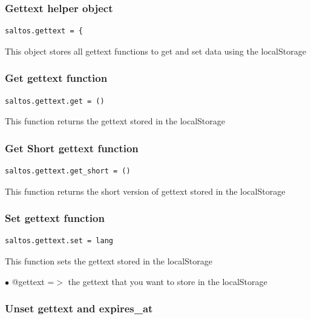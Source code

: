 \documentclass[a4paper]{article}
\begin{document}
\hypertarget{toc237}{}
\subsubsection{Gettext helper object}

\begin{lstlisting}
saltos.gettext = {
\end{lstlisting}

This object stores all gettext functions to get and set data using the localStorage

\hypertarget{toc238}{}
\subsubsection{Get gettext function}

\begin{lstlisting}
saltos.gettext.get = ()
\end{lstlisting}

This function returns the gettext stored in the localStorage

\hypertarget{toc239}{}
\subsubsection{Get Short gettext function}

\begin{lstlisting}
saltos.gettext.get_short = ()
\end{lstlisting}

This function returns the short version of gettext stored in the localStorage

\hypertarget{toc240}{}
\subsubsection{Set gettext function}

\begin{lstlisting}
saltos.gettext.set = lang
\end{lstlisting}

This function sets the gettext stored in the localStorage

\begin{compactitem}
\item[\color{myblue}$\bullet$] @gettext      =$>$ the gettext that you want to store in the localStorage
\end{compactitem}

\hypertarget{toc241}{}
\subsubsection{Unset gettext and expires\_at}
\end{document}
